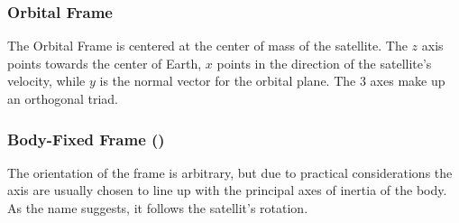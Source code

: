 \subsubsection{Orbital Frame}

The Orbital Frame is centered at the center of mass of the satellite. The $z$ axis points towards the center of Earth, $x$ points in the direction of the satellite's velocity, while $y$ is the normal vector for the orbital plane. The 3 axes make up an orthogonal triad.


\subsubsection{Body-Fixed Frame ()}

The orientation of the frame is arbitrary, but due to practical considerations the axis are usually chosen to line up with the principal axes of inertia of the body. As the name suggests, it follows the satellit's rotation.